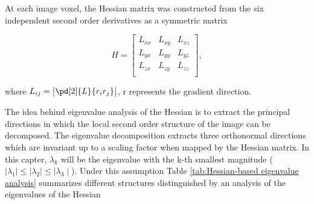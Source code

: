 {At each image voxel, the Hessian matrix was constructed from the six independent second order derivatives as a symmetric matrix

\begin{equation}
 \label{eq:FissureDetection4}
 H = \begin{bmatrix} L_{xx} & L_{xy} & L_{xz} \\ L_{yx} & L_{yy} & L_{yz} \\ L_{zx} & L_{zy} & L_{zz} \\ \end{bmatrix},
\end{equation}

\noindent where $L_{ij} = \begin{vmatrix} \pd[2]{L}{r_i r_j} \\ \end{vmatrix}$, r represents the gradient direction.

The idea behind eigenvalue analysis of the Hessian is to extract the principal directions in which the local second order structure of the image can be decomposed. The eigenvalue decomposition extracts three orthonormal directions which are invariant up to a scaling factor when mapped by the Hessian matrix. In this capter, $\lambda_k$ will be the eigenvalue with the k-th smallest magnitude ($\mid\lambda_{1}\mid\leq\mid\lambda_{2}\mid\leq\mid\lambda_{3}\mid$). Under this assumption Table \ref{tab:Hessian-based eigenvalue analysis} summarizes different structures distinguished by an analysis of the eigenvalues of the Hessian

}
